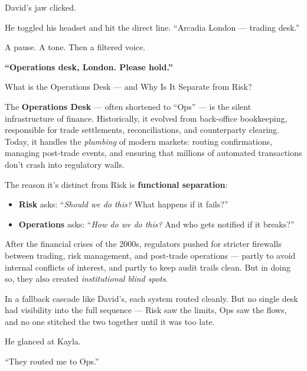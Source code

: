 David’s jaw clicked.

He toggled his headset and hit the direct line. “Arcadia London — trading desk.”

A pause. A tone. Then a filtered voice.

\textbf{“Operations desk, London. Please hold.”}

\begin{HistoricalSidebar}{What is the Operations Desk — and Why Is It Separate from Risk?}

  The \textbf{Operations Desk} — often shortened to “Ops” — is the silent infrastructure of finance.  
  Historically, it evolved from back-office bookkeeping, responsible for trade settlements, reconciliations, 
  and counterparty clearing.  
  Today, it handles the \textit{plumbing} of modern markets: routing confirmations, managing post-trade events, 
  and ensuring that millions of automated transactions don't crash into regulatory walls.
  
  \medskip
  
  The reason it’s distinct from Risk is \textbf{functional separation}:

  \medskip
  
  \begin{itemize}
    \item \textbf{Risk} asks: “\textit{Should we do this?} What happens if it fails?”
    \item \textbf{Operations} asks: “\textit{How do we do this?} And who gets notified if it breaks?”
  \end{itemize}
  
  \medskip
  
  After the financial crises of the 2000s, regulators pushed for stricter firewalls between trading, risk management, 
  and post-trade operations — partly to avoid internal conflicts of interest, and partly to keep audit trails clean.  
  But in doing so, they also created \textit{institutional blind spots}.
  
  \medskip
  
  In a fallback cascade like David's, each system routed cleanly.  
  But no single desk had visibility into the full sequence — Risk saw the limits, Ops saw the flows,  
  and no one stitched the two together until it was too late.
  
\end{HistoricalSidebar}
  

He glanced at Kayla.

“They routed me to Ops.”

